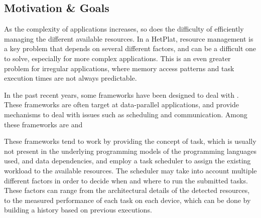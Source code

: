 \documentclass[main.tex]{subfiles}
\begin{document}
\subsection{Motivation \& Goals}

As the complexity of applications increases, so does the difficulty of efficiently managing the different available resources. In a \ac{HetPlat}, resource management is a key problem that depends on several different factors, and can be a difficult one to solve, especially for more complex applications. This is an even greater problem for irregular applications, where memory access patterns and task execution times are not always predictable.

In the past recent years, some frameworks have been designed to deal with \hetplats. These frameworks are often target at data-parallel applications, and provide mechanisms to deal with issues such as scheduling and communication. Among these frameworks are \gama and \starpu {}

These frameworks tend to work by providing the concept of task, which is usually not present in the underlying programming models of the programming languages used, and data dependencies, and employ a task scheduler to assign the existing workload to the available resources.
The scheduler may take into account multiple different factors in order to decide when and where to run the submitted tasks. These factors can range from the architectural details of the detected resources, to the measured performance of each task on each device, which can be done by building a history based on previous executions.
\end{document}
